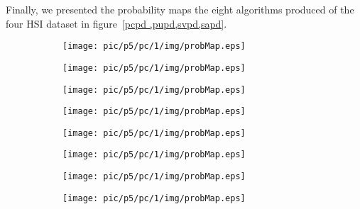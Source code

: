 \documentclass{article}
\begin{document}
	Finally, we presented the probability maps the eight algorithms produced of the four HSI dataset in
	figure~\ref{pcpd ,pupd,svpd,sapd}.
	\begin{figure}
		\begin{subfigure}{0.12\textwidth}
			\texttt{[image: pic/p5/pc/1/img/probMap.eps]}
			\caption{}
		\end{subfigure}
		\begin{subfigure}{0.12\textwidth}
			\texttt{[image: pic/p5/pc/1/img/probMap.eps]}
			\caption{}
		\end{subfigure}
		\begin{subfigure}{0.12\textwidth}
			\texttt{[image: pic/p5/pc/1/img/probMap.eps]}
			\caption{}
		\end{subfigure}
		\begin{subfigure}{0.12\textwidth}
			\texttt{[image: pic/p5/pc/1/img/probMap.eps]}
			\caption{}
		\end{subfigure}
		\begin{subfigure}{0.12\textwidth}
			\texttt{[image: pic/p5/pc/1/img/probMap.eps]}
			\caption{}
		\end{subfigure}
		\begin{subfigure}{0.12\textwidth}
			\texttt{[image: pic/p5/pc/1/img/probMap.eps]}
			\caption{}
		\end{subfigure}
		\begin{subfigure}{0.12\textwidth}
			\texttt{[image: pic/p5/pc/1/img/probMap.eps]}
			\caption{}
		\end{subfigure}
		\begin{subfigure}{0.12\textwidth}
			\texttt{[image: pic/p5/pc/1/img/probMap.eps]}
			\caption{}
		\end{subfigure}
		\label{pcpd}
	\end{figure}
\end{document}
